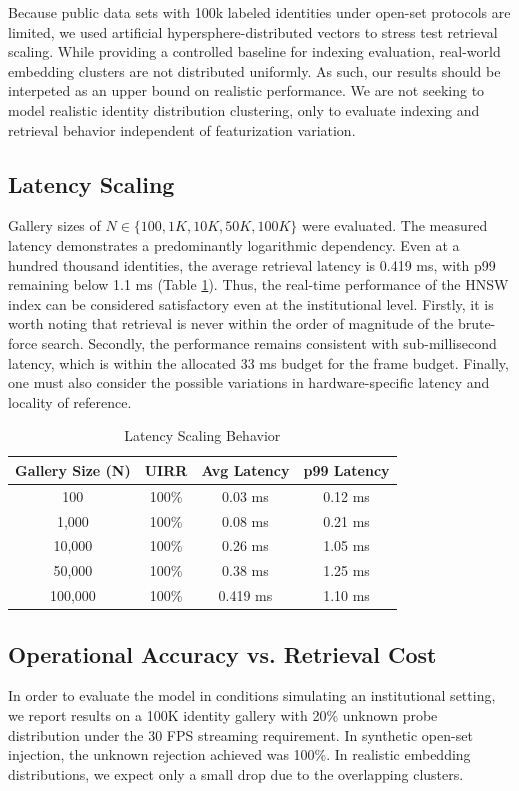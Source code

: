 \documentclass[conference]{IEEEtran}
\begin{document}
Because public data sets with 100k labeled identities under open-set protocols are limited, we used artificial hypersphere-distributed vectors to stress test retrieval scaling. While providing a controlled baseline for indexing evaluation, real-world embedding clusters are not distributed uniformly. As such, our results should be interpeted as an upper bound on realistic performance. We are not seeking to model realistic identity distribution clustering, only to evaluate indexing and retrieval behavior independent of featurization variation.

\subsection{Latency Scaling}
Gallery sizes of $N \in \{100, 1K, 10K, 50K, 100K\}$ were evaluated. The measured latency demonstrates a predominantly logarithmic dependency. Even at a hundred thousand identities, the average retrieval latency is 0.419 ms, with p99 remaining below 1.1 ms (Table \ref{tab_scalability}). Thus, the real-time performance of the HNSW index can be considered satisfactory even at the institutional level. Firstly, it is worth noting that retrieval is never within the order of magnitude of the brute-force search. Secondly, the performance remains consistent with sub-millisecond latency, which is within the allocated 33 ms budget for the frame budget. Finally, one must also consider the possible variations in hardware-specific latency and locality of reference.

\begin{table}[htbp]
\caption{Latency Scaling Behavior}
\begin{center}
\begin{tabular}{|c|c|c|c|}
\hline
Gallery Size (N) & UIRR & Avg Latency & p99 Latency \\
\hline
100 & 100\% & 0.03 ms & 0.12 ms \\
\hline
1,000 & 100\% & 0.08 ms & 0.21 ms \\
\hline
10,000 & 100\% & 0.26 ms & 1.05 ms \\
\hline
50,000 & 100\% & 0.38 ms & 1.25 ms \\
\hline
100,000 & 100\% & 0.419 ms & 1.10 ms \\
\hline
\end{tabular}
\end{center}
\label{tab_scalability}
\end{table}

\subsection{Operational Accuracy vs. Retrieval Cost}
In order to evaluate the model in conditions simulating an institutional setting, we report results on a 100K identity gallery with 20\% unknown probe distribution under the 30 FPS streaming requirement. In synthetic open-set injection, the unknown rejection achieved was 100\%. In realistic embedding distributions, we expect only a small drop due to the overlapping clusters.
\end{document}
